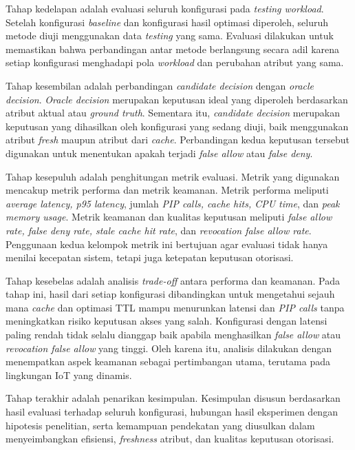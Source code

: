 Tahap kedelapan adalah evaluasi seluruh konfigurasi pada \textit{testing workload}. Setelah konfigurasi \textit{baseline} dan konfigurasi hasil optimasi diperoleh, seluruh metode diuji menggunakan data \textit{testing} yang sama. Evaluasi dilakukan untuk memastikan bahwa perbandingan antar metode berlangsung secara adil karena setiap konfigurasi menghadapi pola \textit{workload} dan perubahan atribut yang sama.

Tahap kesembilan adalah perbandingan \textit{candidate decision} dengan \textit{oracle decision}. \textit{Oracle decision} merupakan keputusan ideal yang diperoleh berdasarkan atribut aktual atau \textit{ground truth}. Sementara itu, \textit{candidate decision} merupakan keputusan yang dihasilkan oleh konfigurasi yang sedang diuji, baik menggunakan atribut \textit{fresh} maupun atribut dari \textit{cache}. Perbandingan kedua keputusan tersebut digunakan untuk menentukan apakah terjadi \textit{false allow} atau \textit{false deny}.

Tahap kesepuluh adalah penghitungan metrik evaluasi. Metrik yang digunakan mencakup metrik performa dan metrik keamanan. Metrik performa meliputi \textit{average latency, p95 latency}, jumlah \textit{PIP calls, cache hits, CPU time}, dan \textit{peak memory usage}. Metrik keamanan dan kualitas keputusan meliputi \textit{false allow rate, false deny rate, stale cache hit rate}, dan \textit{revocation false allow rate}. Penggunaan kedua kelompok metrik ini bertujuan agar evaluasi tidak hanya menilai kecepatan sistem, tetapi juga ketepatan keputusan otorisasi.

Tahap kesebelas adalah analisis \textit{trade-off} antara performa dan keamanan. Pada tahap ini, hasil dari setiap konfigurasi dibandingkan untuk mengetahui sejauh mana \textit{cache} dan optimasi TTL mampu menurunkan latensi dan \textit{PIP calls} tanpa meningkatkan risiko keputusan akses yang salah. Konfigurasi dengan latensi paling rendah tidak selalu dianggap baik apabila menghasilkan \textit{false allow} atau \textit{revocation false allow} yang tinggi. Oleh karena itu, analisis dilakukan dengan menempatkan aspek keamanan sebagai pertimbangan utama, terutama pada lingkungan IoT yang dinamis.

Tahap terakhir adalah penarikan kesimpulan. Kesimpulan disusun berdasarkan hasil evaluasi terhadap seluruh konfigurasi, hubungan hasil eksperimen dengan hipotesis penelitian, serta kemampuan pendekatan yang diusulkan dalam menyeimbangkan efisiensi, \textit{freshness} atribut, dan kualitas keputusan otorisasi.